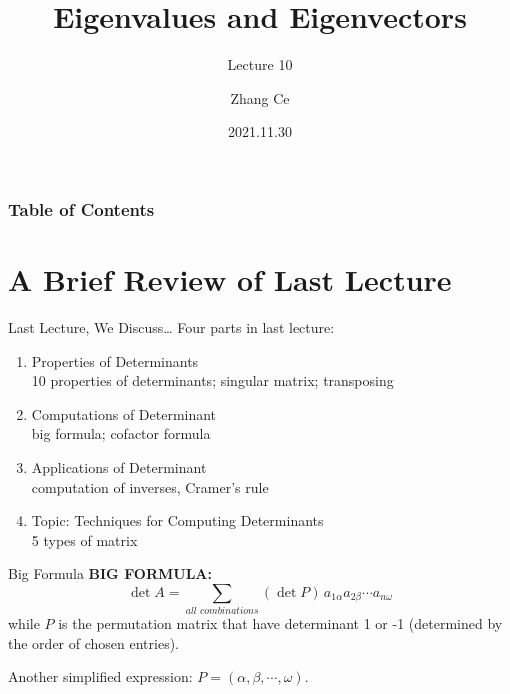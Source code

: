 \documentclass{beamer}
\title[Linear Algebra] %
{Eigenvalues and Eigenvectors}
\subtitle{Lecture 10}
\author[11910803@mail.sustech.edu.cn] %
{
    Zhang Ce
}
\institute[] %
{
    Department of Electrical and Electronic Engineering\\
    Southern University of Science and Technology
}
\date[2021.11.30] %
{2021.11.30}
\begin{document}
\frame{\titlepage}


\begin{frame}
\frametitle{Table of Contents}
\tableofcontents
\end{frame}
\section{A Brief Review of Last Lecture}
\begin{frame}{Last Lecture, We Discuss\dots}
Four parts in last lecture:
    \begin{enumerate}
        \item Properties of Determinants\\
        10 properties of determinants; singular matrix; transposing
        \item Computations of Determinant\\
        big formula; cofactor formula
        \item Applications of Determinant\\
        computation of inverses, Cramer's rule
        \item Topic: Techniques for Computing Determinants\\
        5 types of matrix
    \end{enumerate}

\end{frame}

\begin{frame}{Big Formula}
\textbf{BIG FORMULA:}
\begin{equation*}
    \det A=\sum_{all\,\,combinations}{\left( \det P \right)}\,a_{1\alpha}a_{2\beta}\cdots a_{n\omega}
\end{equation*}
while $P$ is the permutation matrix that have determinant 1 or -1 (determined by the order of chosen entries).

\vspace{3pt}
Another simplified expression: $P=\left( \alpha ,\beta ,\cdots ,\omega \right)$.

\end{frame}
\end{document}
